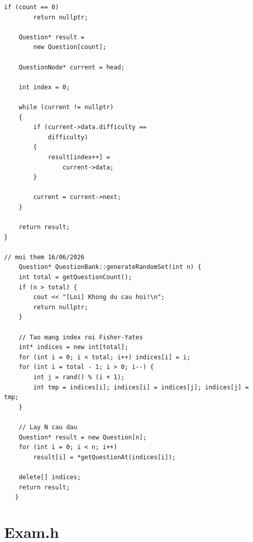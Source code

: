 \documentclass[11pt]{report}
\begin{document}
\begin{lstlisting}[caption={QuestionBank.cpp -- Cài đặt ngân hàng câu hỏi}, label={lst:full_qb_cpp}]
    if (count == 0)
        return nullptr;

    Question* result =
        new Question[count];

    QuestionNode* current = head;

    int index = 0;

    while (current != nullptr)
    {
        if (current->data.difficulty ==
            difficulty)
        {
            result[index++] =
                current->data;
        }

        current = current->next;
    }

    return result;
}

// moi them 16/06/2026
    Question* QuestionBank::generateRandomSet(int n) {
    int total = getQuestionCount();
    if (n > total) {
        cout << "[Loi] Khong du cau hoi!\n";
        return nullptr;
    }

    // Tao mang index roi Fisher-Yates
    int* indices = new int[total];
    for (int i = 0; i < total; i++) indices[i] = i;
    for (int i = total - 1; i > 0; i--) {
        int j = rand() % (i + 1);
        int tmp = indices[i]; indices[i] = indices[j]; indices[j] = tmp;
    }

    // Lay N cau dau
    Question* result = new Question[n];
    for (int i = 0; i < n; i++)
        result[i] = *getQuestionAt(indices[i]);

    delete[] indices;
    return result;
   }
\end{lstlisting}

\section{Exam.h}
\end{document}
